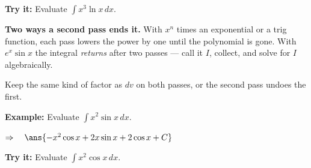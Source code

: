 \documentclass[12pt]{article}
\begin{document}
\begin{tryitbox}
\textbf{Try it:} \quad Evaluate $\displaystyle\int x^3\ln x\,dx$.\\[2pt]
\end{tryitbox}


\begin{formulabox}
\textbf{Two ways a second pass ends it.} With $x^n$ times an exponential or a
trig function, each pass lowers the power by one until the polynomial is gone.
With $e^x\sin x$ the integral \emph{returns} after two passes --- call it $I$,
collect, and solve for $I$ algebraically.\par
Keep the same kind of factor as $dv$ on both passes, or the second pass undoes
the first.
\end{formulabox}

\begin{examplebox}
\textbf{Example:} \quad Evaluate $\displaystyle\int x^2\sin x\,dx$.

$\Rightarrow\quad \ans{-x^2\cos x + 2x\sin x + 2\cos x + C}$
\end{examplebox}

\begin{tryitbox}
\textbf{Try it:} \quad Evaluate $\displaystyle\int x^2\cos x\,dx$.\\[2pt]
\end{tryitbox}
\end{document}
